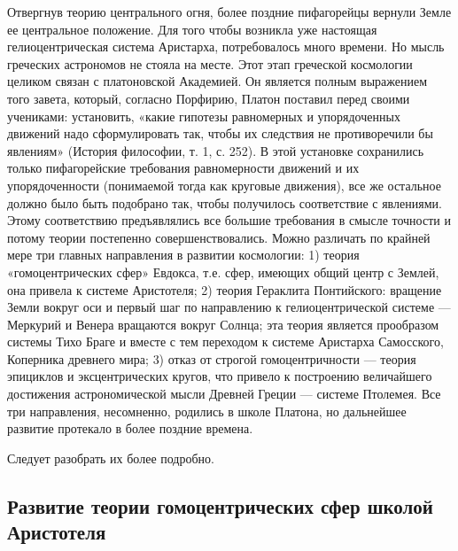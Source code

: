 Отвергнув теорию центрального огня,  более поздние пифагорейцы вернули
Земле ее центральное положение. Для  того чтобы возникла уже настоящая
гелиоцентрическая  система  Аристарха,  потребовалось  много  времени.
Но  мысль  греческих   астрономов  не  стояла  на   месте.  Этот  этап
греческой  космологии  целиком  связан с  платоновской  Академией.  Он
является полным  выражением того  завета, который,  согласно Порфирию,
Платон поставил  перед своими  учениками: установить,  «какие гипотезы
равномерных и упорядоченных движений надо сформулировать так, чтобы их
следствия не противоречили  бы явлениям» (История философии,  т. 1, с.
252).  В этой  установке сохранились  только пифагорейские  требования
равномерности  движений и  их  упорядоченности  (понимаемой тогда  как
круговые  движения),  все  же  остальное должно  было  быть  подобрано
так,  чтобы получилось  соответствие с  явлениями. Этому  соответствию
предъявлялись все большие требования в смысле точности и потому теории
постепенно  совершенствовались. Можно  различать по  крайней мере  три
главных направления в развитии космологии: 1) теория «гомоцентрических
сфер» Евдокса, т.е. сфер, имеющих общий  центр с Землей, она привела к
системе Аристотеля;  2) теория  Гераклита Понтийского:  вращение Земли
вокруг оси и первый шаг по направлению к гелиоцентрической системе ---
Меркурий  и  Венера  вращаются  вокруг  Солнца;  эта  теория  является
прообразом  системы Тихо  Браге и  вместе  с тем  переходом к  системе
Аристарха  Самосского, Коперника  древнего мира;  3) отказ  от строгой
гомоцентричности ---  теория эпициклов  и эксцентрических  кругов, что
привело  к  построению  величайшего достижения  астрономической  мысли
Древней Греции --- системе  Птолемея. Все три направления, несомненно,
родились в  школе Платона,  но дальнейшее  развитие протекало  в более
поздние времена.

Следует разобрать их более подробно.

\subsection{Развитие теории гомоцентрических сфер школой Аристотеля}

